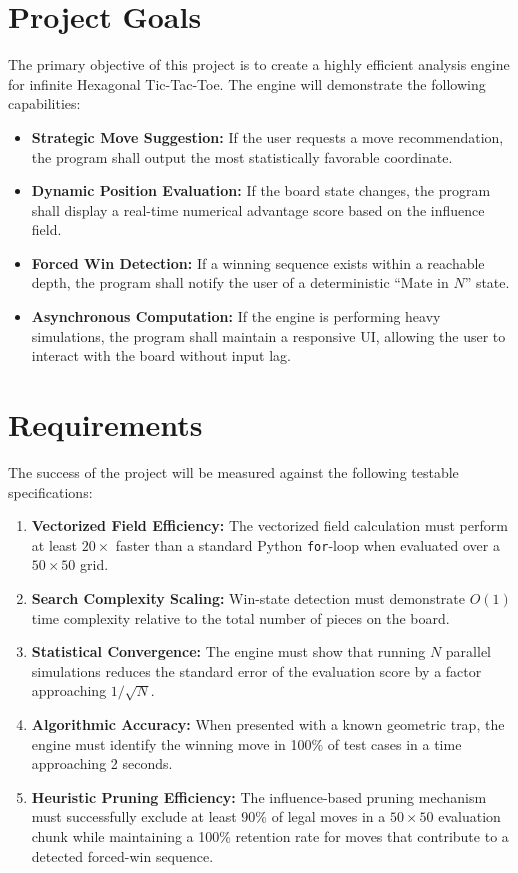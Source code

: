 \documentclass[conference]{IEEEtran}
\begin{document}
\section{Project Goals}
The primary objective of this project is to create a highly efficient analysis engine for infinite Hexagonal Tic-Tac-Toe. The engine will demonstrate the following capabilities:
\begin{itemize}
    \item \textbf{Strategic Move Suggestion:} If the user requests a move recommendation, the program shall output the most statistically favorable coordinate.
    \item \textbf{Dynamic Position Evaluation:} If the board state changes, the program shall display a real-time numerical advantage score based on the influence field.
    \item \textbf{Forced Win Detection:} If a winning sequence exists within a reachable depth, the program shall notify the user of a deterministic ``Mate in $N$'' state.
    \item \textbf{Asynchronous Computation:} If the engine is performing heavy simulations, the program shall maintain a responsive UI, allowing the user to interact with the board without input lag.
\end{itemize}

\section{Requirements}
The success of the project will be measured against the following testable specifications:
\begin{enumerate}
    \item \textbf{Vectorized Field Efficiency:} The vectorized field calculation must perform at least $20\times$ faster than a standard Python \texttt{for}-loop when evaluated over a $50 \times 50$ grid.
    \item \textbf{Search Complexity Scaling:} Win-state detection must demonstrate $O(1)$ time complexity relative to the total number of pieces on the board.
    \item \textbf{Statistical Convergence:} The engine must show that running $N$ parallel simulations reduces the standard error of the evaluation score by a factor approaching $1/\sqrt{N}$.
    \item \textbf{Algorithmic Accuracy:} When presented with a known geometric trap, the engine must identify the winning move in 100\% of test cases in a time approaching 2 seconds.
    \item \textbf{Heuristic Pruning Efficiency:} The influence-based pruning mechanism must successfully exclude at least 90\% of legal moves in a $50 \times 50$ evaluation chunk while maintaining a 100\% retention rate for moves that contribute to a detected forced-win sequence.
\end{enumerate}
\end{document}
